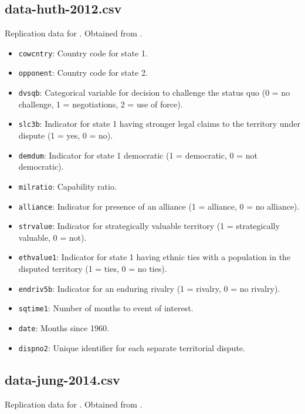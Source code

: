 \documentclass[12pt]{article}
\begin{document}
\subsection{data-huth-2012.csv}

Replication data for \citet{Huth:2012gf}.
Obtained from \citet{huth2012data}.

\begin{itemize}
  \item \texttt{cowcntry}: Country code for state 1.
  \item \texttt{opponent}: Country code for state 2.
  \item \texttt{dvsqb}: Categorical variable for decision to challenge the status quo (0 = no challenge, 1 = negotiations, 2 = use of force).
  \item \texttt{slc3b}: Indicator for state 1 having stronger legal claims to the territory under dispute (1 = yes, 0 = no).
  \item \texttt{demdum}: Indicator for state 1 democratic (1 = democratic, 0 = not democratic).
  \item \texttt{milratio}: Capability ratio.
  \item \texttt{alliance}: Indicator for presence of an alliance (1 = alliance, 0 = no alliance).
  \item \texttt{strvalue}: Indicator for strategically valuable territory (1 = strategically valuable, 0 = not).
  \item \texttt{ethvalue1}: Indicator for state 1 having ethnic ties with a population in the disputed territory (1 = ties, 0 = no ties).
  \item \texttt{endriv5b}: Indicator for an enduring rivalry (1 = rivalry, 0 = no rivalry).
  \item \texttt{sqtime1}: Number of months to event of interest.
  \item \texttt{date}: Months since 1960.
  \item \texttt{dispno2}: Unique identifier for each separate territorial dispute.
\end{itemize}

\subsection{data-jung-2014.csv}

Replication data for \citet{Jung:2014jq}.
Obtained from \citet{jung2014data}.
\end{document}
